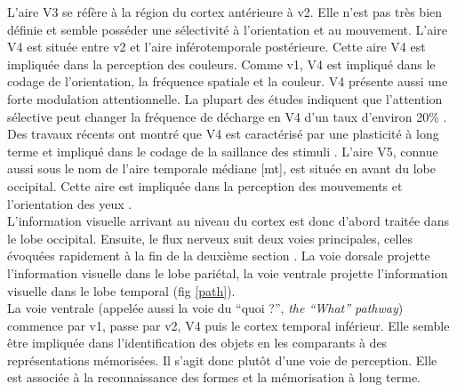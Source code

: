 L'aire V3 se réfère à la région du cortex antérieure à \gls{v2}. Elle n'est pas très bien définie et semble posséder une sélectivité à l'orientation et au mouvement. L'aire V4 est située entre \gls{v2} et l'aire inférotemporale postérieure. Cette aire V4 est impliquée dans la perception des couleurs. Comme \gls{v1}, V4 est impliqué dans le codage de l'orientation, la fréquence spatiale et la couleur. V4 présente aussi une forte modulation attentionnelle. La plupart des études indiquent que l'attention sélective peut changer la fréquence de décharge en V4 d'un taux d'environ 20\% \cite{Moran:1985}. Des travaux récents ont montré que V4 est caractérisé par une plasticité à long terme et impliqué dans le codage de la saillance des stimuli \cite{Mazer:2003, Yang:2004}. L'aire V5, connue aussi sous le nom de l'aire temporale médiane [\gls{mt}], est située en avant du lobe occipital. Cette aire est impliquée dans la perception des mouvements et l'orientation des yeux \cite{Born:2005}.\\




L'information visuelle arrivant au niveau du cortex est donc d'abord traitée dans le lobe occipital. Ensuite, le flux nerveux suit deux voies principales, celles évoquées rapidement à la fin de la deuxième section \cite{Ungerleider:1982,Milner:1995}. La voie dorsale projette l'information visuelle dans le lobe pariétal, la voie ventrale projette l'information visuelle dans le lobe temporal (fig \ref{path}).\\

La voie ventrale (appelée aussi la voie du ``quoi ?'', \textit{the ``What'' pathway}) commence par \gls{v1}, passe par \gls{v2}, V4 puis le cortex temporal inférieur. Elle semble être impliquée dans l'identification des objets en les comparants à des représentations mémorisées. Il s'agit donc plutôt d'une voie de perception. Elle est associée à la reconnaissance des formes et la mémorisation à long terme.\\

